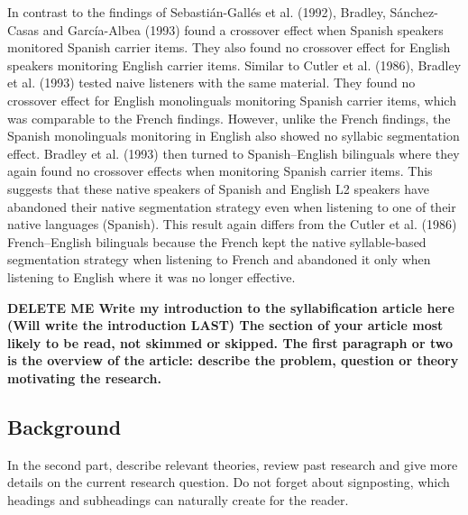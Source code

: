 In contrast to the findings of Sebastián-Gallés et al. (1992), Bradley, Sánchez-Casas and García-Albea (1993) found a crossover effect when Spanish speakers monitored Spanish carrier items. They also found no crossover effect for English speakers monitoring English carrier items. Similar to Cutler et al. (1986), Bradley et al. (1993) tested naive listeners with the same material. They found no crossover effect for English monolinguals monitoring Spanish carrier items, which was comparable to the French findings. However, unlike the French findings, the Spanish monolinguals monitoring in English also showed no syllabic segmentation effect. Bradley et al. (1993) then turned to Spanish–English bilinguals where they again found no crossover effects when monitoring Spanish carrier items. This suggests that these native speakers of Spanish and English L2 speakers have abandoned their native segmentation strategy even when listening to one of their native languages (Spanish). This result again differs from the Cutler et al. (1986) French–English bilinguals because the French kept the native syllable-based segmentation strategy when listening to French and abandoned it only when listening to English where it was no longer effective.


\textbf{DELETE ME Write my introduction to the syllabification article here (Will write the introduction LAST)
The section of your article most likely to be read, not skimmed or skipped. The first paragraph or two is the overview of the article: describe the problem, question or theory motivating the research.} 

\subsection{Background}

In the second part, describe relevant theories, review past research and give more details on the current research question. Do not forget about signposting, which headings and subheadings can naturally create for the reader.


